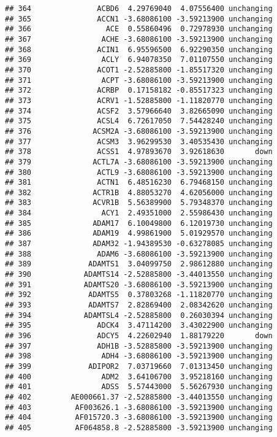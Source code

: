 \documentclass[]{article}
\begin{document}
\begin{verbatim}
## 364               ACBD6  4.29769040  4.07556400 unchanging
## 365               ACCN1 -3.68086100 -3.59213900 unchanging
## 366                 ACE  0.55860496  0.72978930 unchanging
## 367                ACHE -3.68086100 -3.59213900 unchanging
## 368               ACIN1  6.95596500  6.92290350 unchanging
## 369                ACLY  6.94078350  7.01107550 unchanging
## 370               ACOT1 -2.52885800 -1.85517320 unchanging
## 371                ACPT -3.68086100 -3.59213900 unchanging
## 372               ACRBP  0.17158182 -0.85517323 unchanging
## 373               ACRV1 -1.52885800 -1.11820770 unchanging
## 374               ACSF2  3.57966640  3.82665090 unchanging
## 375               ACSL4  6.72617050  7.54428240 unchanging
## 376              ACSM2A -3.68086100 -3.59213900 unchanging
## 377               ACSM3  3.96299530  3.40535430 unchanging
## 378               ACSS1  4.97893670  3.92618630       down
## 379              ACTL7A -3.68086100 -3.59213900 unchanging
## 380               ACTL9 -3.68086100 -3.59213900 unchanging
## 381               ACTN1  6.48516230  6.79468150 unchanging
## 382              ACTR1B  4.88053270  4.62056000 unchanging
## 383              ACVR1B  5.56389900  5.79348370 unchanging
## 384                ACY1  2.49351000  2.55986430 unchanging
## 385              ADAM17  6.10049800  6.12019730 unchanging
## 386              ADAM19  4.99861900  5.01929570 unchanging
## 387              ADAM32 -1.94389530 -0.63278085 unchanging
## 388               ADAM6 -3.68086100 -3.59213900 unchanging
## 389             ADAMTS1  3.04099750  2.98612880 unchanging
## 390            ADAMTS14 -2.52885800 -3.44013550 unchanging
## 391            ADAMTS20 -3.68086100 -3.59213900 unchanging
## 392             ADAMTS5  0.37803268 -1.11820770 unchanging
## 393             ADAMTS7  2.82869400  2.08342620 unchanging
## 394            ADAMTSL4 -2.52885800  0.26030394 unchanging
## 395               ADCK4  3.47114200  3.43022900 unchanging
## 396               ADCY5  4.22602940  1.88179220       down
## 397               ADH1B -3.52885800 -3.59213900 unchanging
## 398                ADH4 -3.68086100 -3.59213900 unchanging
## 399             ADIPOR2  7.03719660  7.01313450 unchanging
## 400                ADM2  3.64106700  3.95218160 unchanging
## 401                ADSS  5.57443000  5.56267930 unchanging
## 402         AE000661.37 -2.52885800 -3.44013550 unchanging
## 403          AF003626.1 -3.68086100 -3.59213900 unchanging
## 404          AF015720.3 -3.68086100 -3.59213900 unchanging
## 405          AF064858.8 -2.52885800 -3.59213900 unchanging

\end{verbatim}
\end{document}
